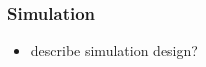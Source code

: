 \documentclass{beamer}
\begin{document}
%
%
%
\section[Simulation]{}

\begin{frame}
\frametitle{Simulation}
\begin{itemize}
\item describe simulation design?
\end{itemize}
\end{frame}
\end{document}
